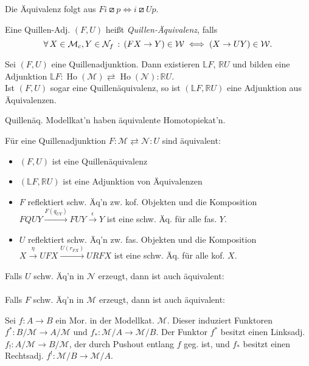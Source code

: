 \documentclass{cheat-sheet}
\newcommand{\lhhe}{\boxslash} %
\newcommand{\Weak}{\mathcal{W}} %
\newcommand{\ModC}{\mathcal{M}} %
\newcommand{\NodC}{\mathcal{N}} %
\DeclareMathOperator{\Ho}{Ho} %
\newcommand{\LD}[1]{\mathbb{L} #1} %
\newcommand{\RD}[1]{\mathbb{R} #1} %
\begin{document}
\begin{bem}
  Die Äquivalenz folgt aus $Fi \lhhe p \iff i \lhhe Up$.
\end{bem}

\begin{defn}
  Eine Quillen-Adj. $(F, U)$ heißt \emph{Quillen-Äquivalenz}, falls
  \[ \fa{X \in \ModC_c, Y \in \NodC_f} (FX \to Y) \in \Weak \iff (X \to UY) \in \Weak. \]
\end{defn}

\begin{satz}
  Sei $(F, U)$ eine Quillenadjunktion. Dann existieren $\LD{F}$, $\RD{U}$ und bilden eine Adjunktion $\LD{F} : \Ho(\ModC) \rightleftarrows \Ho(\NodC) : \RD{U}$. \\
  Ist $(F, U)$ sogar eine Quillenäquivalenz, so ist $(\LD{F}, \RD{U})$ eine Adjunktion aus Äquivalenzen.
\end{satz}

\begin{kor}
  Quillenäq. Modellkat'n haben äquivalente Homotopiekat'n.
\end{kor}

\begin{prop}
  Für eine Quillenadjunktion $F : \ModC \rightleftarrows \NodC : U$ sind äquivalent:
  \begin{itemize}
    \item $(F, U)$ ist eine Quillenäquivalenz
    \item $(\LD{F}, \RD{U})$ ist eine Adjunktion von Äquivalenzen
    \item $F$ reflektiert schw. Äq'n zw. kof. Objekten und die Komposition $FQUY \xrightarrow{F(q_{UY})} FUY \xrightarrow{\epsilon} Y$ ist eine schw. Äq. für alle fas. $Y$.
    \item $U$ reflektiert schw. Äq'n zw. fas. Objekten und die Komposition $X \xrightarrow{\eta} UFX \xrightarrow{U(r_{FX})} URFX$ ist eine schw. Äq. für alle kof. $X$.
  \end{itemize}
  Falls $U$ schw. Äq'n in $\NodC$ erzeugt, dann ist auch äquivalent: \\
   \\[2pt]
  Falls $F$ schw. Äq'n in $\ModC$ erzeugt, dann ist auch äquivalent: \\
\end{prop}

\begin{defn}
  Sei $f : A \to B$ ein Mor. in der Modellkat. $\ModC$. Dieser induziert Funktoren $f^* : B/\ModC \to A/\ModC$ und $f_* : \ModC/A \to \ModC/B$.
  Der Funktor $f^*$ besitzt einen Linksadj. $f_{!} : A/\ModC \to B/\ModC$, der durch Pushout entlang $f$ geg. ist, und $f_*$ besitzt einen Rechtsadj. $f^{!} : \ModC/B \!\to\! \ModC/A$.
\end{defn}
\end{document}
